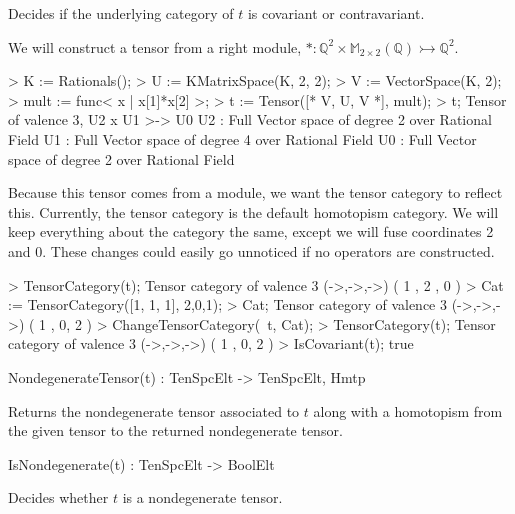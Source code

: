 Decides if the underlying category of $t$ is covariant or contravariant.

\begin{example}[TensorCatProps]

We will construct a tensor from a right module, $*:\mathbb{Q}^2 \times \mathbb{M}_{2\times 2}(\mathbb{Q})\rightarrowtail \mathbb{Q}^2$.
\begin{code}
> K := Rationals();
> U := KMatrixSpace(K, 2, 2);
> V := VectorSpace(K, 2);
> mult := func< x | x[1]*x[2] >;
> t := Tensor([* V, U, V *], mult);
> t;
Tensor of valence 3, U2 x U1 >-> U0
U2 : Full Vector space of degree 2 over Rational Field
U1 : Full Vector space of degree 4 over Rational Field
U0 : Full Vector space of degree 2 over Rational Field
\end{code}

Because this tensor comes from a module, we want the tensor category to reflect this.
Currently, the tensor category is the default homotopism category.
We will keep everything about the category the same, except we will fuse coordinates 2 and 0.
These changes could easily go unnoticed if no operators are constructed.
\begin{code}
> TensorCategory(t);
Tensor category of valence 3 (->,->,->) ({ 1 },{ 2 },{ 0 })
> Cat := TensorCategory([1, 1, 1], {{2,0},{1}});
> Cat;
Tensor category of valence 3 (->,->,->) ({ 1 },{ 0, 2 })
> ChangeTensorCategory(~t, Cat);
> TensorCategory(t);
Tensor category of valence 3 (->,->,->) ({ 1 },{ 0, 2 })
> IsCovariant(t);
true
\end{code}
\end{example}

\begin{intrinsics}
NondegenerateTensor(t) : TenSpcElt -> TenSpcElt, Hmtp
\end{intrinsics}

Returns the nondegenerate tensor associated to $t$ along with a homotopism 
from the given tensor to the returned nondegenerate tensor.

\begin{intrinsics}
IsNondegenerate(t) : TenSpcElt -> BoolElt
\end{intrinsics}

Decides whether $t$ is a nondegenerate tensor.


